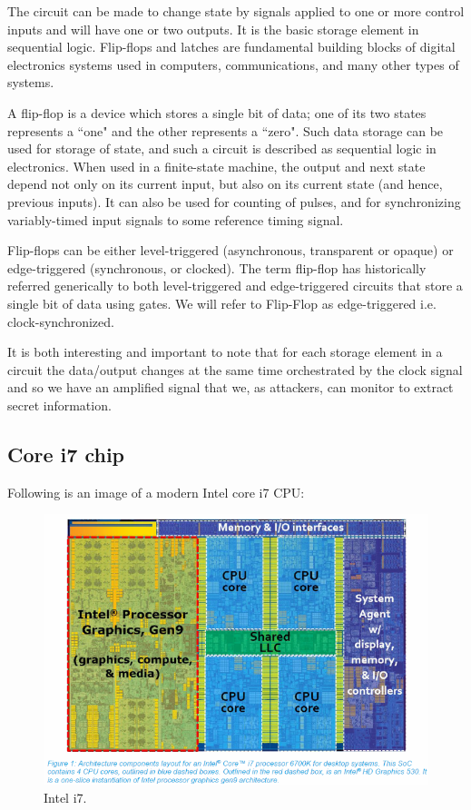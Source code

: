 The circuit can be made to change state by signals applied to one or more
control inputs and will have one or two outputs. It is the basic storage element
in sequential logic. Flip-flops and latches are fundamental building blocks of
digital electronics systems used in computers, communications, and many other
types of systems.

A flip-flop is a device which stores a single bit of data; one of
its two states represents a ``one" and the other represents a ``zero". Such data
storage can be used for storage of state, and such a circuit is described as
sequential logic in electronics. When used in a finite-state machine, the output
and next state depend not only on its current input, but also on its current
state (and hence, previous inputs). It can also be used for counting of pulses,
and for synchronizing variably-timed input signals to some reference timing
signal.

Flip-flops can be either level-triggered (asynchronous, transparent or opaque)
or edge-triggered (synchronous, or clocked). The term flip-flop has historically
referred generically to both level-triggered and edge-triggered circuits that
store a single bit of data using gates. We will refer to Flip-Flop as
edge-triggered i.e. clock-synchronized.

It is both interesting and important to note that for each storage element in a circuit
the data/output changes at the same time orchestrated by the clock signal and so we have an amplified signal that we, as attackers, can monitor to extract secret information.

 \subsection {Core i7 chip}
 
Following is an image of a modern Intel core i7 CPU:

\begin{figure}[!ht]
	\centering
	\includegraphics{images/i7.png}
	\caption{Intel i7.} \label{fig:i7}
\end{figure}


